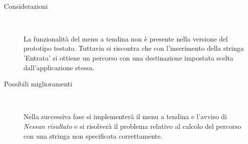 \documentclass[../../Sperimentazione.tex]{subfiles}
\begin{document}
\begin{tcolorbox}[fonttitle=\bfseries, 
								adjusted title={\Large Prova 11A.1}, 
								breakable, 
								sharp corners=south,
								colback=white, 
								colframe=white!60!black]
\begin{description}[leftmargin=0.7cm,labelwidth=!]
        			\tcbline
        			
        			\item[Analisi risultati] \ \par
        				\begin{description}
        					\item[Considerazioni] \ \par
        						La funzionalità del menu a tendina non è presente nella versione del prototipo testato. Tuttavia si riscontra che con l'inserimento della stringa 'Entrata' si ottiene un percorso con una destinazione impostata scelta dall'applicazione stessa.
        					
        					\item[Possibili miglioramenti] \ \par 
        						Nella successiva fase si implementerà il menu a tendina e l'avviso di \textit{Nessun risultato} e si risolverà il problema relativo al calcolo del percorso con una stringa non specificata correttamente.
        				\end{description}
        				
				\end{description}  
				
			\end{tcolorbox}



	
	\newpage		
\end{document}
